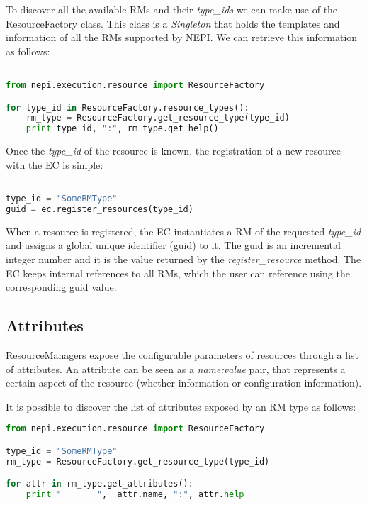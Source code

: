 To discover all the available RMs and their \emph{type\_ids} we
can make use of the ResourceFactory class.
This class is a \emph{Singleton} that holds the templates and information 
of all the RMs supported by NEPI. We can retrieve this information as follows:

\begin{lstlisting}[language=Python]

from nepi.execution.resource import ResourceFactory

for type_id in ResourceFactory.resource_types():
    rm_type = ResourceFactory.get_resource_type(type_id)
    print type_id, ":", rm_type.get_help()

\end{lstlisting}

Once the \emph{type\_id} of the resource is known, the registration of a
new resource with the EC is simple:

\begin{lstlisting}[language=Python]

type_id = "SomeRMType"
guid = ec.register_resources(type_id)

\end{lstlisting}

When a resource is registered, the EC instantiates a RM of the 
requested \emph{type\_id} and assigns a global unique identifier 
(guid) to it. The guid is an incremental integer number and it 
is the value returned by the \emph{register\_resource} method.
The EC keeps internal references to all RMs, which the user can
reference using the corresponding guid value.


\subsection{Attributes}

ResourceManagers expose the configurable parameters of resources
through a list of attributes. An attribute can be seen as a
\emph{{name:value}} pair, that represents a certain aspect of
the resource (whether information or configuration information).

It is possible to discover the list of attributes exposed by an 
RM type as follows:

\begin{lstlisting}[language=Python]
from nepi.execution.resource import ResourceFactory

type_id = "SomeRMType"
rm_type = ResourceFactory.get_resource_type(type_id)

for attr in rm_type.get_attributes():
    print "       ",  attr.name, ":", attr.help
    
\end{lstlisting}

